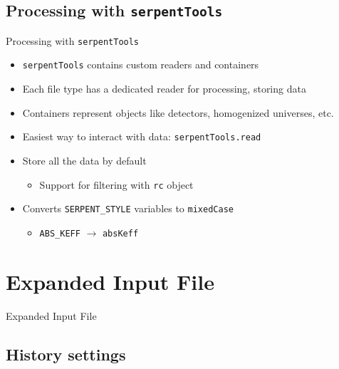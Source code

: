 \documentclass{beamer}
\newcommand{\st}{\texttt{serpentTools} }
\begin{document}
\subsection{Processing with \st}

\begin{frame}{Processing with \st}
    \begin{itemize}
        \item{\st contains custom readers and containers}
        \item{Each file type has a dedicated reader for processing, storing data}
        \item{Containers represent objects like detectors, homogenized universes, etc.}
        \item{Easiest way to interact with data: \texttt{serpentTools.read}}
        \item{Store all the data by default}
        \begin{itemize}
            \item{Support for filtering with \texttt{rc} object}
        \end{itemize}
        \item{Converts \texttt{SERPENT\_STYLE} variables to \texttt{mixedCase}}
        \begin{itemize}
            \item{\texttt{ABS\_KEFF} $\rightarrow$ \texttt{absKeff}}
        \end{itemize}
    \end{itemize}
\end{frame}

\section{Expanded Input File}

\begin{frame}{Expanded Input File}
    \tableofcontents[sectionstyle=show/hide,subsectionstyle=show/show/hide]
\end{frame}

\subsection{History settings}
\end{document}
